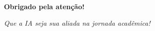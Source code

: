 \documentclass[aspectratio=169,12pt]{beamer}
\begin{document}
\begin{frame}{}
    \begin{center}
        \textcolor{accent}{\Huge \faHeart}
        
        \vspace{1cm}
        
        {\Large \textbf{Obrigado pela atenção!}}
        
        \vspace{0.5cm}
        
        \textcolor{secondary}{\textit{Que a IA seja sua aliada na jornada acadêmica!}}
        
        \vspace{1cm}
        
        \textcolor{accent}{\faRobot\, \faBrain\, \faGraduationCap}
    \end{center}
\end{frame}
\end{document}
